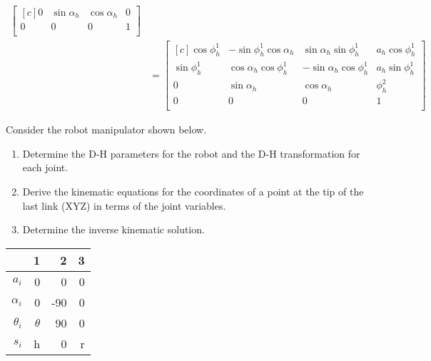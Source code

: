 \documentclass[onecolumn,10pt]{jhwhw}
\begin{document}
\begin{align*}
\begin{bmatrix*}[c]
0 & \sin \alpha_h &  \cos \alpha_h & 0\\
0 & 0 & 0 & 1 \\
\end{bmatrix*} \\
&=
\begin{bmatrix*}[c]
\cos \phi_h^1  &  -\sin \phi_h^1  \cos \alpha_h  &  \sin \alpha_h  \sin \phi_h^1  & a_h \cos \phi_h^1  \\
\sin \phi_h^1  &   \cos \alpha_h  \cos \phi_h^1  & -\sin \alpha_h  \cos \phi_h^1  & a_h \sin \phi_h^1  \\
             0 &                  \sin \alpha_h  &                 \cos \alpha_h &           \phi_h^2 \\
             0 &                               0 &                              0 &                  1 \\
\end{bmatrix*}
\end{align*}

\problem{}
Consider the robot manipulator shown below.
\begin{enumerate}
    \item Determine the D-H parameters for the robot and the D-H transformation for each joint.
    \item Derive the kinematic equations for the coordinates of a point at the tip of the last link (XYZ) in terms of the joint variables.
    \item Determine the inverse kinematic solution.
\end{enumerate}

\begin{center}
\begin{tabular}{r|rrr}
           & 1 & 2 & 3 \\
\midrule
$a_i$      &          0 &   0 &   0 \\
$\alpha_i$ &          0 & -90 &   0 \\
$\theta_i$ &   $\theta$ &  90 &   0 \\
$s_i$      &          h &   0 &   r \\
\end{tabular}
\end{center}
\end{document}
